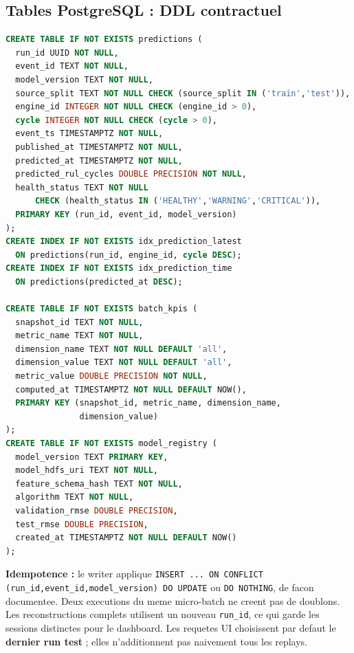 \documentclass[10pt,a4paper]{article}
\newcommand{\code}[1]{{\small\ttfamily\nolinkurl{#1}}}
\begin{document}
\subsection{Tables PostgreSQL : DDL contractuel}
\begin{lstlisting}[language=SQL]
CREATE TABLE IF NOT EXISTS predictions (
  run_id UUID NOT NULL,
  event_id TEXT NOT NULL,
  model_version TEXT NOT NULL,
  source_split TEXT NOT NULL CHECK (source_split IN ('train','test')),
  engine_id INTEGER NOT NULL CHECK (engine_id > 0),
  cycle INTEGER NOT NULL CHECK (cycle > 0),
  event_ts TIMESTAMPTZ NOT NULL,
  published_at TIMESTAMPTZ NOT NULL,
  predicted_at TIMESTAMPTZ NOT NULL,
  predicted_rul_cycles DOUBLE PRECISION NOT NULL,
  health_status TEXT NOT NULL
      CHECK (health_status IN ('HEALTHY','WARNING','CRITICAL')),
  PRIMARY KEY (run_id, event_id, model_version)
);
CREATE INDEX IF NOT EXISTS idx_prediction_latest
  ON predictions(run_id, engine_id, cycle DESC);
CREATE INDEX IF NOT EXISTS idx_prediction_time
  ON predictions(predicted_at DESC);

CREATE TABLE IF NOT EXISTS batch_kpis (
  snapshot_id TEXT NOT NULL,
  metric_name TEXT NOT NULL,
  dimension_name TEXT NOT NULL DEFAULT 'all',
  dimension_value TEXT NOT NULL DEFAULT 'all',
  metric_value DOUBLE PRECISION NOT NULL,
  computed_at TIMESTAMPTZ NOT NULL DEFAULT NOW(),
  PRIMARY KEY (snapshot_id, metric_name, dimension_name,
               dimension_value)
);
CREATE TABLE IF NOT EXISTS model_registry (
  model_version TEXT PRIMARY KEY,
  model_hdfs_uri TEXT NOT NULL,
  feature_schema_hash TEXT NOT NULL,
  algorithm TEXT NOT NULL,
  validation_rmse DOUBLE PRECISION,
  test_rmse DOUBLE PRECISION,
  created_at TIMESTAMPTZ NOT NULL DEFAULT NOW()
);
\end{lstlisting}
\textbf{Idempotence :} le writer applique \code{INSERT ... ON CONFLICT (run_id,event_id,model_version) DO UPDATE} ou \code{DO NOTHING}, de facon documentee. Deux executions du meme micro-batch ne creent pas de doublons. Les reconstructions complets utilisent un nouveau \code{run_id}, ce qui garde les sessions distinctes pour le dashboard. Les requetes UI choisissent par defaut le \textbf{dernier run test} ; elles n'additionnent pas naivement tous les replays.
\end{document}
